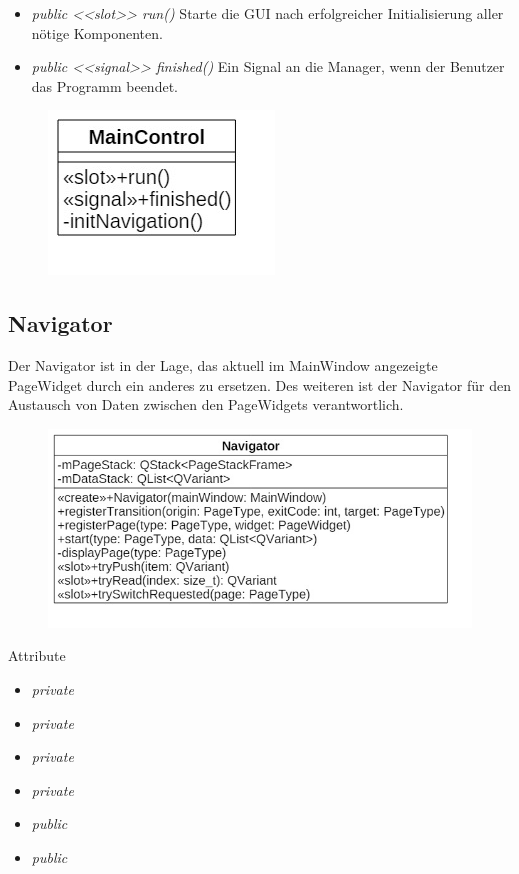 \begin{itemize}
	\item\textit{public <<slot>> run()}
	Starte die GUI nach erfolgreicher Initialisierung aller nötige Komponenten.
	\item\textit{public <<signal>> finished()}
	Ein Signal an die Manager, wenn der Benutzer das Programm beendet.
\end{itemize}

\begin{figure}[H]
\centering
\includegraphics[scale=0.5]{img/Klassendiagramm/Klassen/Controller/MainControl}
\label{fig:mainControl}
\end{figure}

\subsection*{Navigator}
Der Navigator ist in der Lage, das aktuell im MainWindow angezeigte PageWidget durch ein anderes zu ersetzen. Des weiteren ist der Navigator für den Austausch von Daten zwischen den PageWidgets verantwortlich.

\begin{figure}[H]
\centering
\includegraphics[scale=0.5]{img/Klassendiagramm/Klassen/Controller/Navigator}
\label{fig:navigator}
\end{figure}

Attribute
\begin{itemize}
	\item\textit{private }
	
	\item\textit{private }
	
	\item\textit{private }
	
	\item\textit{private }
	
	\item\textit{public }  
	
	\item\textit{public }
	
\end{itemize}

